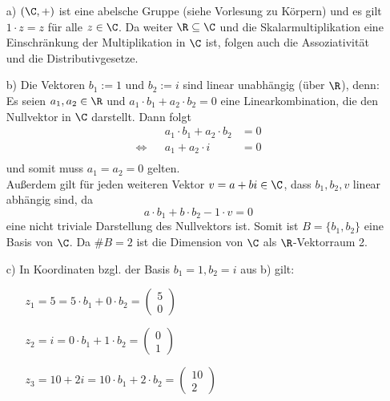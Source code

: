\begin{itemize}
\item[a)] $(\C,+)$ ist eine abelsche Gruppe (siehe Vorlesung zu Körpern) und es gilt $1\cdot z =z$ für alle $z \in \C$.
Da weiter $\R \subseteq \C$ und die Skalarmultiplikation eine Einschränkung der Multiplikation in $\C$ ist, folgen auch die Assoziativität und die Distributivgesetze.

\item[b)] Die Vektoren $b_1:=1$ und $b_2:=i$ sind linear unabhängig (über $\R$), denn:\\
Es seien $a_1,a_2 \in \R$ und  $a_1\cdot b_1 + a_2 \cdot b_2 =0$ eine Linearkombination, die den Nullvektor in $\C$ darstellt. Dann folgt
\begin{align*}
&& a_1\cdot b_1 + a_2 \cdot b_2 &=0\\
\Leftrightarrow && a_1+ a_2\cdot i &=0\\
\end{align*}
und somit muss $a_1=a_2=0$ gelten.\\
Außerdem gilt für jeden weiteren Vektor $v=a+bi \in \C$, dass $b_1,b_2,v$ linear abhängig sind, da 
$$
a\cdot b_1+b\cdot b_2-1\cdot v=0
$$
eine nicht triviale Darstellung des Nullvektors ist. Somit ist $B=\{b_1,b_2\}$ eine Basis von $\C$. Da $\#B=2$ ist die Dimension von $\C$ als $\R$-Vektorraum 2.

\item[c)] In Koordinaten bzgl. der Basis $b_1=1,b_2=i$ aus b) gilt:
\begin{itemize}
\item[] $z_1=5=5\cdot b_1 + 0\cdot b_2 =\begin{pmatrix} 5 \\ 0 \end{pmatrix}$
\item[] $z_2=i=0\cdot b_1 + 1\cdot b_2 =\begin{pmatrix} 0 \\ 1 \end{pmatrix}$
\item[] $z_3=10 +2i=10\cdot b_1 + 2\cdot b_2 =\begin{pmatrix} 10 \\ 2 \end{pmatrix}$
\end{itemize}

\end{itemize}




